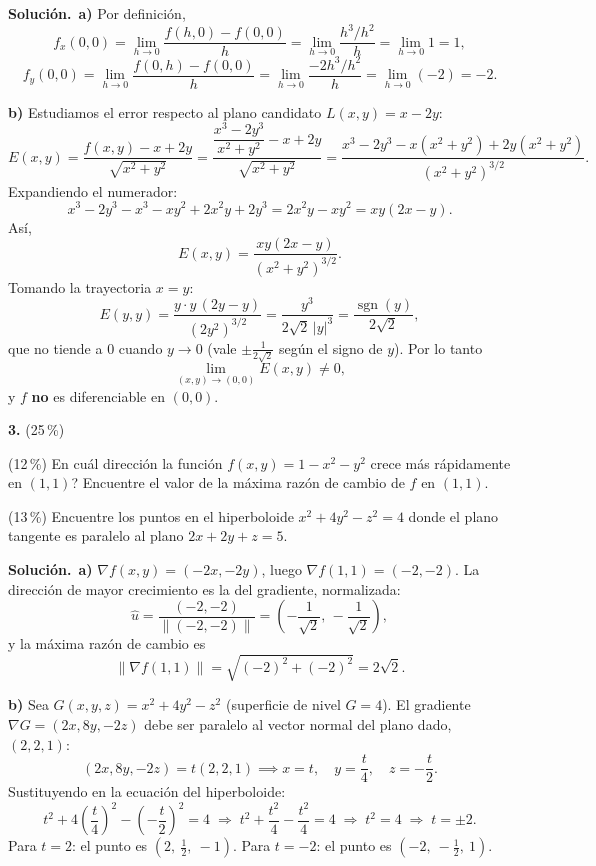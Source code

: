 \documentclass[11pt]{article}
\newcommand{\sol}{\medskip\noindent\textbf{\textcolor{solgreen}{Soluci\'on.}}\ }
\begin{document}
\sol \textbf{a)} Por definici\'on,
$$f_x(0,0) = \lim_{h\to 0} \frac{f(h,0)-f(0,0)}{h} = \lim_{h\to 0} \frac{h^3/h^2}{h} = \lim_{h\to 0} 1 = 1,$$
$$f_y(0,0) = \lim_{h\to 0} \frac{f(0,h)-f(0,0)}{h} = \lim_{h\to 0} \frac{-2h^3/h^2}{h} = \lim_{h\to 0} (-2) = -2.$$

\textbf{b)} Estudiamos el error respecto al plano candidato $L(x,y)=x-2y$:
$$E(x,y) = \frac{f(x,y)-x+2y}{\sqrt{x^2+y^2}} = \frac{\dfrac{x^3-2y^3}{x^2+y^2}-x+2y}{\sqrt{x^2+y^2}} = \frac{x^3-2y^3-x(x^2+y^2)+2y(x^2+y^2)}{(x^2+y^2)^{3/2}}.$$
Expandiendo el numerador:
$$x^3-2y^3-x^3-xy^2+2x^2y+2y^3 = 2x^2y - xy^2 = xy(2x-y).$$
As\'i,
$$E(x,y) = \frac{xy(2x-y)}{(x^2+y^2)^{3/2}}.$$
Tomando la trayectoria $x=y$:
$$E(y,y) = \frac{y\cdot y\,(2y-y)}{(2y^2)^{3/2}} = \frac{y^3}{2\sqrt2\,|y|^3} = \frac{\operatorname{sgn}(y)}{2\sqrt2},$$
que no tiende a $0$ cuando $y\to 0$ (vale $\pm\frac{1}{2\sqrt2}$ seg\'un el signo de $y$). Por lo tanto
$$\lim_{(x,y)\to(0,0)} E(x,y) \neq 0,$$
y $f$ \textbf{no} es diferenciable en $(0,0)$.

\bigskip
\noindent\textbf{3.} (25\,\%)
\begin{opciones}
  \item[a.] (12\,\%) En cu\'al direcci\'on la funci\'on $f(x,y)=1-x^2-y^2$ crece m\'as r\'apidamente en $(1,1)$? Encuentre el valor de la m\'axima raz\'on de cambio de $f$ en $(1,1)$.
  \item[b.] (13\,\%) Encuentre los puntos en el hiperboloide $x^2+4y^2-z^2=4$ donde el plano tangente es paralelo al plano $2x+2y+z=5$.
\end{opciones}

\sol \textbf{a)} $\nabla f(x,y)=(-2x,-2y)$, luego $\nabla f(1,1)=(-2,-2)$. La direcci\'on de mayor crecimiento es la del gradiente, normalizada:
$$\hat u = \frac{(-2,-2)}{\|(-2,-2)\|} = \left(-\frac{1}{\sqrt2},\,-\frac{1}{\sqrt2}\right),$$
y la m\'axima raz\'on de cambio es
$$\|\nabla f(1,1)\| = \sqrt{(-2)^2+(-2)^2} = 2\sqrt2.$$

\textbf{b)} Sea $G(x,y,z)=x^2+4y^2-z^2$ (superficie de nivel $G=4$). El gradiente $\nabla G=(2x,8y,-2z)$ debe ser paralelo al vector normal del plano dado, $(2,2,1)$:
$$(2x,8y,-2z) = t(2,2,1) \implies x=t,\quad y=\frac{t}{4},\quad z=-\frac{t}{2}.$$
Sustituyendo en la ecuaci\'on del hiperboloide:
$$t^2 + 4\left(\frac{t}{4}\right)^2 - \left(-\frac{t}{2}\right)^2 = 4 \;\Longrightarrow\; t^2+\frac{t^2}{4}-\frac{t^2}{4} = 4 \;\Longrightarrow\; t^2=4 \;\Longrightarrow\; t=\pm 2.$$
Para $t=2$: el punto es $\left(2,\ \tfrac12,\ -1\right)$. Para $t=-2$: el punto es $\left(-2,\ -\tfrac12,\ 1\right)$.
\end{document}
